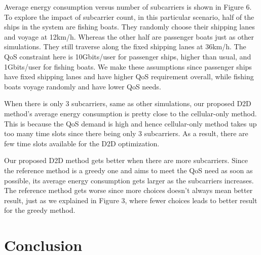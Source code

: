 \documentclass{ieeeaccess}
\begin{document}
Average energy consumption versus number of subcarriers is shown in Figure 6. To explore the impact of subcarrier count, in this particular scenario, half of the ships in the system are fishing boats. They randomly choose their shipping lanes and voyage at 12km/h. Whereas the other half are passenger boats just as other simulations. They still traverse along the fixed shipping lanes at 36km/h. The QoS constraint here is 10Gbits/user for passenger ships, higher than usual, and 1Gbits/user for fishing boats. We make these assumptions since passenger ships have fixed shipping lanes and have higher QoS requirement overall, while fishing boats voyage randomly and have lower QoS needs.

When there is only 3 subcarriers, same as other simulations, our proposed D2D method's average energy consumption is pretty close to the cellular-only method. This is because the QoS demand is high and hence cellular-only method takes up too many time slots since there being only 3 subcarriers. As a result, there are few time slots available for the D2D optimization.

Our proposed D2D method gets better when there are more subcarriers. Since the reference method is a greedy one and aims to meet the QoS need as soon as possible, its average energy consumption gets larger as the subcarriers increases. The reference method gets worse since more choices doesn't always mean better result, just as we explained in Figure 3, where fewer choices leads to better result for the greedy method.

\section{Conclusion}\label{sec:4}
\end{document}
